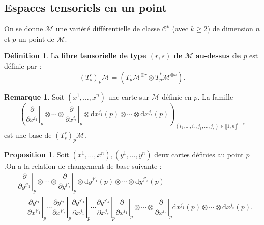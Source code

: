 \documentclass[12pt,a4paper]{article}
\theoremstyle{definition}
\newtheorem{prop}[thm]{Proposition}
\newtheorem{defn}[thm]{Définition}
\newtheorem{rqe}[thm]{Remarque}
\begin{document}
\subsection{Espaces tensoriels en un point}
On se donne $\mathcal{M}$ une variété différentielle de classe $\mathcal{C}^k$ (avec $k\geqslant 2$) de dimension $n$ et $p$ un point de $\mathcal{M}$.
\begin{defn}
La \textbf{fibre tensorielle de type $(r,s)$ de $\mathcal{M}$ au-dessus de $p$} est définie par :
$$
(T^r_s)_p\mathcal{M}=\left(T_p\mathcal{M}^{\otimes r}\otimes T_p^*\mathcal{M}^{\otimes s}\right).
$$
\end{defn}
\begin{rqe}
Soit $(x^1,\ldots,x^n)$ une carte sur $\mathcal{M}$ définie en $p$. La famille $$\left(\left.\dfrac{\partial}{\partial x^{i_1}}\right|_p\otimes\cdots\otimes\left.\dfrac{\partial}{\partial x^{i_r}}\right|_p\otimes\mathrm{d}x^{j_1}(p)\otimes\cdots\otimes\mathrm{d}x^{j_s}(p)\right)_{(i_1,\ldots,i_r,j_1,\ldots,j_s)\in\llbracket 1,n\rrbracket^{r+s}}$$ est une base de $(T^r_s)_p\mathcal{M}$.
\end{rqe}
\begin{prop}
Soit $(x^1,\ldots,x^n),(y^1,\ldots,y^n)$ deux cartes définies au point $p$.\newline On a la relation de changement de base suivante :
\begin{align*}
&\left.\dfrac{\partial}{\partial y^{i'_1}}\right|_p\otimes\cdots\otimes\left.\dfrac{\partial}{\partial y^{i'_r}}\right|_p\otimes\mathrm{d}y^{j'_1}(p)\otimes\cdots\otimes\mathrm{d}y^{j'_s}(p)\\&=\left.\dfrac{\partial y^{i_1}}{\partial x^{i'_1}}\right|_p\cdots\left.\dfrac{\partial y^{i_r}}{\partial x^{i'_r}}\right|_p\left.\dfrac{\partial y^{j'_1}}{\partial x^{j_1}}\right|_p\cdots\left.\dfrac{\partial y^{j'_s}}{\partial x^{j_s}}\right|_p\left.\dfrac{\partial}{\partial x^{i_1}}\right|_p\otimes\cdots\otimes\left.\dfrac{\partial}{\partial x^{i_r}}\right|_p\mathrm{d}x^{j_1}(p)\otimes\cdots\otimes\mathrm{d}x^{j_s}(p).
\end{align*}
\end{prop}
\newpage
\end{document}
